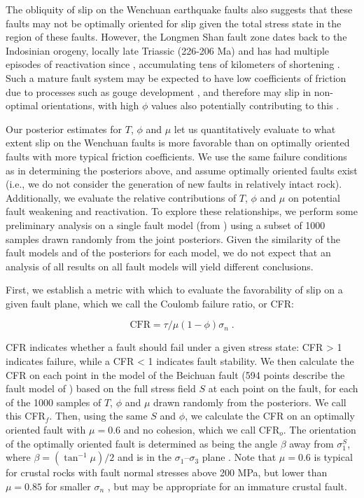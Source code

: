 \documentclass[draft,jgrga]{AGUTeX}
\begin{document}
\begin{article}
The obliquity of slip on the Wenchuan earthquake faults also suggests
that these faults may not be optimally oriented for slip given the total
stress state in the region of these faults. However, the Longmen Shan
fault zone dates back to the Indosinian orogeny, locally late Triassic
(226-206 Ma) \citep{yong2003} and has had multiple episodes of
reactivation since \citep[e.g.,][]{burchfiel1995, wang2012}, accumulating
tens of kilometers of shortening \citep[e.g.,][]{hubbard2010}. Such a mature
fault system may be expected to have low coefficients of friction due to
processes such as gouge development \citep[e.g.,][]{kuo2014}, and therefore
may slip in non-optimal orientations, with high $\phi$ values also
potentially contributing to this \citep[e.g.,][]{sibson1985}.

Our posterior estimates for $T$, $\phi$ and $\mu$ let us quantitatively
evaluate to what extent slip on the Wenchuan faults is more favorable
than on optimally oriented faults with more typical friction
coefficients. We use the same failure conditions as in determining the
posteriors above, and assume optimally oriented faults exist
(i.e., we do not consider the generation of new faults in relatively 
intact rock).
Additionally, we evaluate the relative contributions of $T$, $\phi$ and
$\mu$ on potential fault weakening and reactivation. To explore these
relationships, we perform some preliminary analysis on a single fault
model (from \citet{zhang2011}) using a subset of 1000
samples drawn randomly from the joint posteriors. Given the similarity
of the fault models and of the posteriors for each model, we do not
expect that an analysis of all results on all fault models will yield
different conclusions.

First, we establish a metric with which to evaluate the favorability of
slip on a given fault plane, which we call the Coulomb failure ratio, or
CFR:

\begin{equation}
\mathrm{CFR} = \tau / \mu (1 - \phi) \sigma_n \; .
\label{eqn:cfr}
\end{equation}

CFR indicates whether a fault should fail under a given stress state:
CFR \textgreater{} 1 indicates failure, while a CFR \textless{} 1
indicates fault stability. We then calculate the CFR on each point in
the model of the Beichuan fault (594 points describe the fault model of
\citet{zhang2011}) based on the full stress field $S$ at
each point on the fault, for each of the 1000 samples of $T$, $\phi$ and
$\mu$ drawn randomly from the posteriors. We call this CFR$_f$. Then,
using the same $S$ and $\phi$, we calculate the CFR on an optimally
oriented fault with $\mu=0.6$ and no cohesion, which we call CFR$_o$.
The orientation of the optimally oriented fault is determined as being
the angle $\beta$ away from $\sigma^S_1$, where $\beta = (\tan^{-1} \mu) / 2$
and is in the $\sigma_1$--$\sigma_3$ plane \citep[e.g.,][]{sibson1985}.
Note that $\mu=0.6$ is typical for crustal rocks with fault normal stresses
above 200 MPa, but lower than $\mu = 0.85$ for smaller $\sigma_n$
\citep{byerlee1978}, but may be appropriate for an immature crustal
fault.


\end{article}
\end{document}
